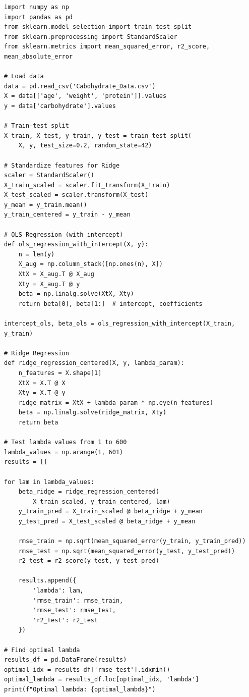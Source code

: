 \documentclass{article}
\begin{document}
\begin{lstlisting}[caption={Multiple Regression Analysis Script (Key Components)}]
import numpy as np
import pandas as pd
from sklearn.model_selection import train_test_split
from sklearn.preprocessing import StandardScaler
from sklearn.metrics import mean_squared_error, r2_score, mean_absolute_error

# Load data
data = pd.read_csv('Cabohydrate_Data.csv')
X = data[['age', 'weight', 'protein']].values
y = data['carbohydrate'].values

# Train-test split
X_train, X_test, y_train, y_test = train_test_split(
    X, y, test_size=0.2, random_state=42)

# Standardize features for Ridge
scaler = StandardScaler()
X_train_scaled = scaler.fit_transform(X_train)
X_test_scaled = scaler.transform(X_test)
y_mean = y_train.mean()
y_train_centered = y_train - y_mean

# OLS Regression (with intercept)
def ols_regression_with_intercept(X, y):
    n = len(y)
    X_aug = np.column_stack([np.ones(n), X])
    XtX = X_aug.T @ X_aug
    Xty = X_aug.T @ y
    beta = np.linalg.solve(XtX, Xty)
    return beta[0], beta[1:]  # intercept, coefficients

intercept_ols, beta_ols = ols_regression_with_intercept(X_train, y_train)

# Ridge Regression
def ridge_regression_centered(X, y, lambda_param):
    n_features = X.shape[1]
    XtX = X.T @ X
    Xty = X.T @ y
    ridge_matrix = XtX + lambda_param * np.eye(n_features)
    beta = np.linalg.solve(ridge_matrix, Xty)
    return beta

# Test lambda values from 1 to 600
lambda_values = np.arange(1, 601)
results = []

for lam in lambda_values:
    beta_ridge = ridge_regression_centered(
        X_train_scaled, y_train_centered, lam)
    y_train_pred = X_train_scaled @ beta_ridge + y_mean
    y_test_pred = X_test_scaled @ beta_ridge + y_mean
    
    rmse_train = np.sqrt(mean_squared_error(y_train, y_train_pred))
    rmse_test = np.sqrt(mean_squared_error(y_test, y_test_pred))
    r2_test = r2_score(y_test, y_test_pred)
    
    results.append({
        'lambda': lam,
        'rmse_train': rmse_train,
        'rmse_test': rmse_test,
        'r2_test': r2_test
    })

# Find optimal lambda
results_df = pd.DataFrame(results)
optimal_idx = results_df['rmse_test'].idxmin()
optimal_lambda = results_df.loc[optimal_idx, 'lambda']
print(f"Optimal lambda: {optimal_lambda}")
\end{lstlisting}
\end{document}
